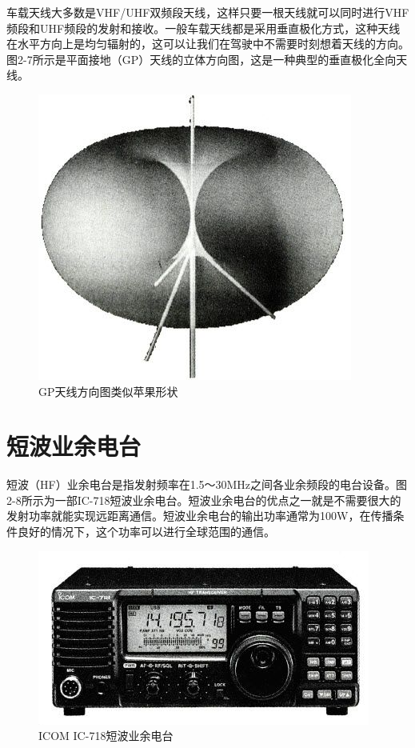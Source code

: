 \documentclass[12pt,UTF8]{ctexbook}
\begin{document}
车载天线大多数是VHF/UHF双频段天线，这样只要一根天线就可以同时进行VHF频段和UHF频段的发射和接收。一般车载天线都是采用垂直极化方式，这种天线在水平方向上是均匀辐射的，这可以让我们在驾驶中不需要时刻想着天线的方向。图2-7所示是平面接地（GP）天线的立体方向图，这是一种典型的垂直极化全向天线。

\begin{figure}[htbp]
	\centering
	\includegraphics[width=0.7\linewidth]{24}
	\caption{GP天线方向图类似苹果形状}
	\label{fig:1}
\end{figure}

\section{短波业余电台}

短波（HF）业余电台是指发射频率在1.5～30MHz之间各业余频段的电台设备。图2-8所示为一部IC-718短波业余电台。短波业余电台的优点之一就是不需要很大的发射功率就能实现远距离通信。短波业余电台的输出功率通常为100W，在传播条件良好的情况下，这个功率可以进行全球范围的通信。

\begin{figure}[htbp]
	\centering
	\includegraphics[width=0.7\linewidth]{25}
	\caption{ICOM IC-718短波业余电台}
	\label{fig:1}
\end{figure}
\end{document}
